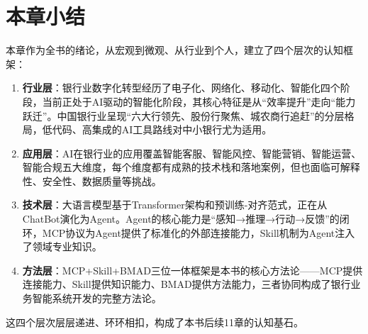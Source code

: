 
\section*{本章小结}

本章作为全书的绪论，从宏观到微观、从行业到个人，建立了四个层次的认知框架：

\begin{enumerate}[leftmargin=2em]
  \item \textbf{行业层}：银行业数字化转型经历了电子化、网络化、移动化、智能化四个阶段，当前正处于AI驱动的智能化阶段，其核心特征是从``效率提升''走向``能力跃迁''。中国银行业呈现``六大行领先、股份行聚焦、城农商行追赶''的分层格局，低代码、高集成的AI工具路线对中小银行尤为适用。
  \item \textbf{应用层}：AI在银行业的应用覆盖智能客服、智能风控、智能营销、智能运营、智能合规五大维度，每个维度都有成熟的技术栈和落地案例，但也面临可解释性、安全性、数据质量等挑战。
  \item \textbf{技术层}：大语言模型基于Transformer架构和预训练-对齐范式，正在从ChatBot演化为Agent。Agent的核心能力是``感知→推理→行动→反馈''的闭环，MCP协议为Agent提供了标准化的外部连接能力，Skill机制为Agent注入了领域专业知识。
  \item \textbf{方法层}：MCP+Skill+BMAD三位一体框架是本书的核心方法论——MCP提供连接能力、Skill提供知识能力、BMAD提供方法能力，三者协同构成了银行业务智能系统开发的完整方法论。
\end{enumerate}

这四个层次层层递进、环环相扣，构成了本书后续11章的认知基石。



